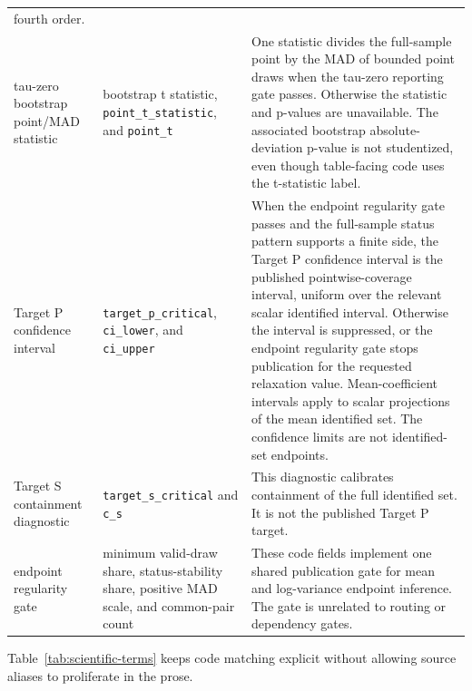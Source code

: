 \documentclass[11pt]{article}
\DeclareRobustCommand{\code}[1]{%
  \ifmmode\text{\ttfamily\detokenize{#1}}\else\nolinkurl{#1}\fi}
\newcommand{\TauP}{\textnormal{Target P}}
\newcommand{\TauS}{\textnormal{Target S}}
\begin{document}
\begin{longtable}{@{}>{\raggedright\arraybackslash}p{}
  >{\raggedright\arraybackslash}p{}
  >{\raggedright\arraybackslash}p{}@{}}
fourth order.\\
tau-zero bootstrap point/MAD statistic & bootstrap t statistic,
\code{point_t_statistic}, and \code{point_t} & One statistic divides the
full-sample point by the MAD of bounded point draws when the tau-zero reporting
gate passes. Otherwise the statistic and p-values are unavailable. The
associated bootstrap absolute-deviation p-value is not studentized, even though
table-facing code uses the t-statistic label.\\
\TauP{} confidence interval & \code{target_p_critical}, \code{ci_lower}, and
\code{ci_upper} & When the endpoint regularity gate passes and the full-sample
status pattern supports a finite side, the Target P confidence interval is the published pointwise-coverage
interval, uniform over the relevant scalar identified interval. Otherwise the
interval is suppressed, or the endpoint regularity gate stops publication for the
requested relaxation value. Mean-coefficient intervals apply to scalar projections of the mean
identified set. The confidence limits are not identified-set endpoints.\\
\TauS{} containment diagnostic & \code{target_s_critical} and \code{c_s} & This
diagnostic calibrates containment of the full identified set. It is not the
published \TauP{} target.\\
endpoint regularity gate & minimum valid-draw share, status-stability share,
positive MAD scale, and common-pair count & These code fields implement one
shared publication gate for mean and log-variance endpoint inference. The gate is
unrelated to routing or dependency gates.\\
\bottomrule
\end{longtable}
\normalsize

Table~\ref{tab:scientific-terms} keeps code matching explicit without allowing
source aliases to proliferate in the prose.
\end{document}
